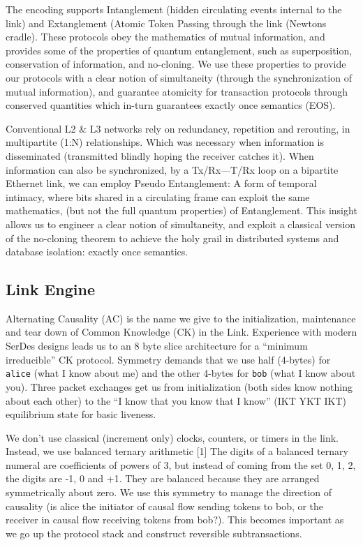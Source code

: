 \documentclass[../HFT-main.tex]{subfiles}
\begin{document}
The encoding supports Intanglement (hidden circulating events internal to the link) and Extanglement (Atomic Token Passing through the link (Newtons cradle). These protocols obey the mathematics of mutual information, and provides some of the properties of quantum entanglement, such as superposition, conservation of information, and no-cloning. We use these properties to provide our protocols with a clear notion of simultaneity (through the synchronization of mutual information), and guarantee atomicity for transaction protocols through conserved quantities which in-turn guarantees exactly once semantics (EOS).

Conventional L2 \& L3 networks rely on redundancy, repetition and rerouting, in multipartite (1:N) relationships. Which was necessary when information is disseminated (transmitted blindly hoping the receiver catches it). When information can also be synchronized, by a Tx/Rx—T/Rx loop on a bipartite Ethernet link, we can employ Pseudo Entanglement: A form of temporal intimacy, where bits shared in a circulating frame can exploit the same mathematics, (but not the full quantum properties) of Entanglement. This insight allows us to engineer a clear notion of simultaneity, and exploit a classical version of the no-cloning theorem to achieve the holy grail in distributed systems and database isolation: exactly once semantics.

\subsection{Link Engine}

Alternating Causality (AC) is the name we give to the initialization, maintenance and tear down of Common Knowledge (CK) in the Link. Experience with modern SerDes designs leads us to an 8 byte slice architecture for a “minimum irreducible” CK protocol. Symmetry demands that we use half (4-bytes) for \texttt{alice} (what I know about me) and the other 4-bytes for \texttt{bob} (what I know about you). Three packet exchanges get us from initialization (both sides know nothing about each other) to the “I know that you know that I know” (IKT YKT IKT) equilibrium state for basic liveness. 

We don’t use classical (increment only) clocks, counters, or timers in the link. Instead, we use balanced ternary arithmetic [1] The digits of a balanced ternary numeral are coefficients of powers of 3, but instead of coming from the set {0, 1, 2}, the digits are {-1, 0 and +1}. They are balanced because they are arranged symmetrically about zero.  We use this symmetry to manage the direction of causality (is alice the initiator of causal flow sending tokens to bob, or the receiver in causal flow receiving tokens from bob?).  This becomes important as we go up the protocol stack and construct reversible subtransactions.  
\end{document}
